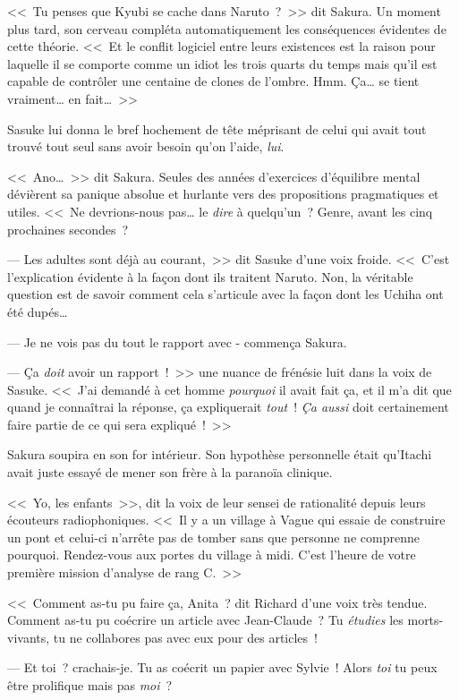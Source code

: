 <<~Tu penses que Kyubi se cache dans Naruto~?~>> dit Sakura. Un moment plus tard, son cerveau compléta automatiquement les conséquences évidentes de cette théorie. <<~Et le conflit logiciel entre leurs existences est la raison pour laquelle il se comporte comme un idiot les trois quarts du temps mais qu'il est capable de contrôler une centaine de clones de l'ombre. Hmm. Ça… se tient vraiment… en fait…~>>

Sasuke lui donna le bref hochement de tête méprisant de celui qui avait tout trouvé tout seul sans avoir besoin qu'on l'aide, \emph{lui}.

<<~Ano…~>> dit Sakura. Seules des années d'exercices d'équilibre mental dévièrent sa panique absolue et hurlante vers des propositions pragmatiques et utiles. <<~Ne devrions-nous pas… le \emph{dire} à quelqu'un~? Genre, avant les cinq prochaines secondes~?

--- Les adultes sont déjà au courant,~>> dit Sasuke d'une voix froide. <<~C'est l'explication évidente à la façon dont ils traitent Naruto. Non, la véritable question est de savoir comment cela s'articule avec la façon dont les Uchiha ont été dupés…

--- Je ne vois pas du tout le rapport avec - commença Sakura.

--- Ça \emph{doit} avoir un rapport~!~>> une nuance de frénésie luit dans la voix de Sasuke. <<~J'ai demandé à cet homme \emph{pourquoi} il avait fait ça, et il m'a dit que quand je connaîtrai la réponse, ça expliquerait \emph{tout}~! \emph{Ça aussi} doit certainement faire partie de ce qui sera expliqué~!~>>

Sakura soupira en son for intérieur. Son hypothèse personnelle était qu'Itachi avait juste essayé de mener son frère à la paranoïa clinique.

<<~Yo, les enfants~>>, dit la voix de leur sensei de rationalité depuis leurs écouteurs radiophoniques. <<~Il y a un village à Vague qui essaie de construire un pont et celui-ci n'arrête pas de tomber sans que personne ne comprenne pourquoi. Rendez-vous aux portes du village à midi. C'est l'heure de votre première mission d'analyse de rang C.~>>

\clearpage
{}

<<~Comment as-tu pu faire ça, Anita~? dit Richard d'une voix très tendue. Comment as-tu pu coécrire un article avec Jean-Claude~? Tu \emph{étudies} les morts-vivants, tu ne collabores pas avec eux pour des articles~!

--- Et toi~? crachais-je. Tu as coécrit un papier avec Sylvie~! Alors \emph{toi} tu peux être prolifique mais pas \emph{moi}~?

